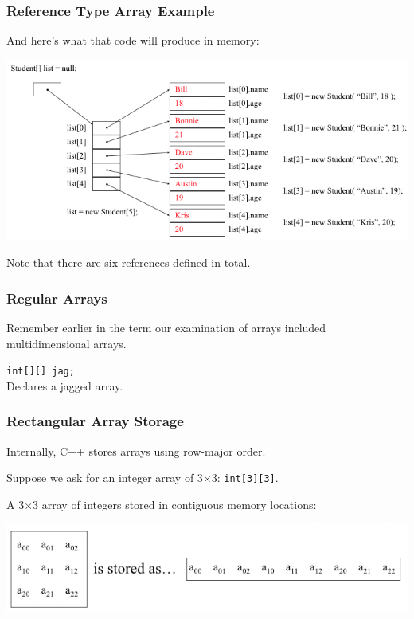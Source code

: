 \begin{frame}
\frametitle{Reference Type Array Example}

And here's what that code will produce in memory:

\begin{center}
\includegraphics[width=\textwidth]{images/students.png}
\end{center}

Note that there are six references defined in total.

\end{frame}



\begin{frame}
\frametitle{Regular Arrays}
Remember earlier in the term our examination of arrays included multidimensional arrays.

\texttt{int[][] jag;}\\
\quad Declares a jagged array.

\end{frame}



\begin{frame}
\frametitle{Rectangular Array Storage}
Internally, C++ stores arrays using row-major order.

Suppose we ask for an integer array of 3$\times$3: \texttt{int[3][3]}.

A 3$\times$3 array of integers  stored in contiguous memory locations:

\begin{center}
	\includegraphics[width=\textwidth]{images/rowmajor.png}
\end{center}

\end{frame}

